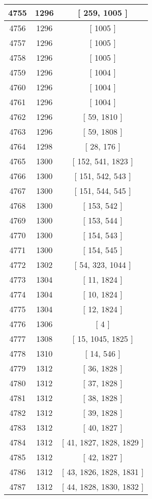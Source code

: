 \begin{center}
\begin{longtable}[H]{|| c c c ||}
\hline
4755 & 1296 & [ 259, 1005 ] \\ 
\hline
4756 & 1296 & [ 1005 ] \\ 
\hline
4757 & 1296 & [ 1005 ] \\ 
\hline
4758 & 1296 & [ 1005 ] \\ 
\hline
4759 & 1296 & [ 1004 ] \\ 
\hline
4760 & 1296 & [ 1004 ] \\ 
\hline
4761 & 1296 & [ 1004 ] \\ 
\hline
4762 & 1296 & [ 59, 1810 ] \\ 
\hline
4763 & 1296 & [ 59, 1808 ] \\ 
\hline
4764 & 1298 & [ 28, 176 ] \\ 
\hline
4765 & 1300 & [ 152, 541, 1823 ] \\ 
\hline
4766 & 1300 & [ 151, 542, 543 ] \\ 
\hline
4767 & 1300 & [ 151, 544, 545 ] \\ 
\hline
4768 & 1300 & [ 153, 542 ] \\ 
\hline
4769 & 1300 & [ 153, 544 ] \\ 
\hline
4770 & 1300 & [ 154, 543 ] \\ 
\hline
4771 & 1300 & [ 154, 545 ] \\ 
\hline
4772 & 1302 & [ 54, 323, 1044 ] \\ 
\hline
4773 & 1304 & [ 11, 1824 ] \\ 
\hline
4774 & 1304 & [ 10, 1824 ] \\ 
\hline
4775 & 1304 & [ 12, 1824 ] \\ 
\hline
4776 & 1306 & [ 4 ] \\ 
\hline
4777 & 1308 & [ 15, 1045, 1825 ] \\ 
\hline
4778 & 1310 & [ 14, 546 ] \\ 
\hline
4779 & 1312 & [ 36, 1828 ] \\ 
\hline
4780 & 1312 & [ 37, 1828 ] \\ 
\hline
4781 & 1312 & [ 38, 1828 ] \\ 
\hline
4782 & 1312 & [ 39, 1828 ] \\ 
\hline
4783 & 1312 & [ 40, 1827 ] \\ 
\hline
4784 & 1312 & [ 41, 1827, 1828, 1829 ] \\ 
\hline
4785 & 1312 & [ 42, 1827 ] \\ 
\hline
4786 & 1312 & [ 43, 1826, 1828, 1831 ] \\ 
\hline
4787 & 1312 & [ 44, 1828, 1830, 1832 ] \\ 

\end{longtable}
\end{center}
